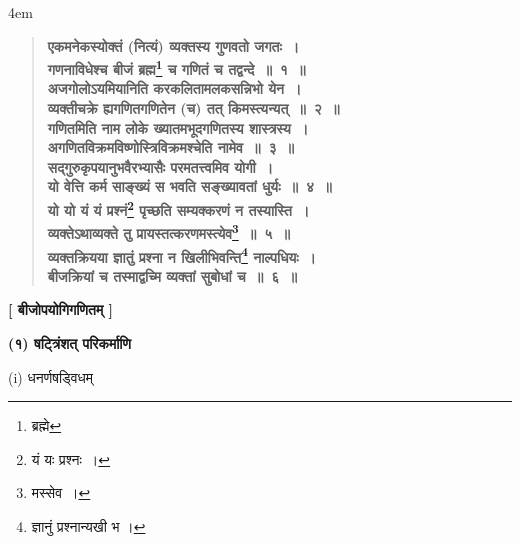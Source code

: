 \documentclass[11pt, openany]{book}
\makeatletter
\newcommand{\devanagarinumeral}[1]{%
	\devanagaridigits{\number \csname c@#1\endcsname}}
\makeatother
\begin{document}
 \label{1}
\advance\leftmargini 4em \begin{quote}
\textbf{{\color{purple}एकमनेकस्योक्तं (नित्यं) व्यक्तस्य गुणवतो जगतः~।\\
गणनाविधेश्च बीजं ब्रह्म\renewcommand{\thefootnote}{१}\footnote{ब्रह्मे} च गणितं च तद्वन्दे~॥~१~॥}}\\

\textbf{{\color{purple}अजगोलोऽयमियानिति करकलितामलकसन्निभो येन~।\\
व्यक्तीचक्रे ह्यगणितगणितेन (च) तत् किमस्त्यन्यत्~॥~२~॥}}\\

\textbf{{\color{purple}गणितमिति नाम लोके ख्यातमभूदगणितस्य शास्त्रस्य~।\\
अगणितविक्रमविष्णोस्त्रिविक्रमश्चेति नामेव~॥~३~॥}}\\

\textbf{{\color{purple}सद्गुरुकृपयानुभवैरभ्यासैः परमतत्त्वमिव योगी~।\\
यो वेत्ति कर्म साङ्ख्यं स भवति सङ्ख्यावतां धुर्यः~॥~४~॥}}\\

\textbf{{\color{purple}यो यो यं यं प्रश्नं\renewcommand{\thefootnote}{२}\footnote{यं यः प्रश्नः~।} पृच्छति सम्यक्करणं न तस्यास्ति~।\\
व्यक्तेऽथाव्यक्ते तु प्रायस्तत्करणमस्त्येव\renewcommand{\thefootnote}{३}\footnote{मस्सेव~।}~॥~५~॥}}\\

\textbf{{\color{purple}व्यक्तक्रियया ज्ञातुं प्रश्ना न खिलीभिवन्ति\renewcommand{\thefootnote}{४}\footnote{ज्ञानुं प्रश्नान्यखी भ ।} नाल्पधियः~।\\
बीजक्रियां च तस्माद्वच्मि व्यक्तां सुबोधां च~॥~६~॥}}
\end{quote}
\vspace{28mm}

\newpage
\renewcommand{\thepage}{\devanagarinumeral{page}}
\setcounter{page}{2}

\begin{center}
{\large{\textbf{[ बीजोपयोगिगणितम् ]}}}\\
\vspace{4mm}

 \label{pari}
\textbf{(१) षट्त्रिंशत् परिकर्माणि}\\
\vspace{4mm}

(i) धनर्णषड्विधम्
\end{center}
\vspace{4mm}
\end{document}
